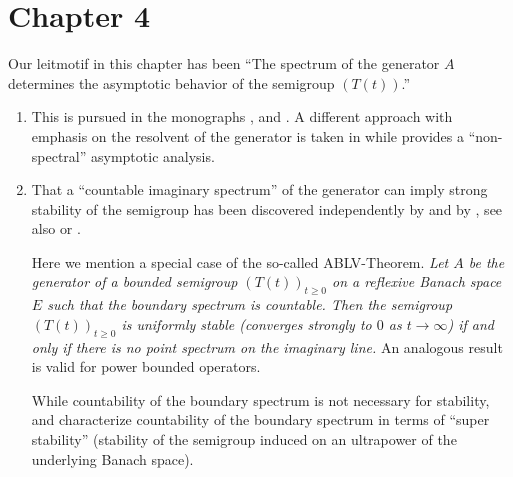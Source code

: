 \section*{Chapter 4}
Our leitmotif in this chapter has been
\enquote{The spectrum of the generator $A$ determines the asymptotic behavior of the semigroup $(T(t))$.}
\begin{enumerate}%

\item 

This is pursued in the monographs \textcite[Chapter V]{zbmath01354832}, 
\textcite[Sections 3 and 4]{zbmath00921898} and \textcite[Chapter III]{zbmath05625330}.
A different approach with emphasis on the resolvent of the generator is taken in 
\textcite[Chapter 5]{zbmath05842872} while  \textcite{zbmath05080033} provides a 
\enquote{non-spectral} asymptotic analysis.

\item
That a \enquote{countable imaginary spectrum} of the generator can imply strong stability of the semigroup has been discovered independently by  \textcite{zbmath04063855} and by \textcite{zbmath04042353}, see also
\textcite[Theorem 5.5.5]{zbmath05842872} or \textcite[Theorem 2.21]{zbmath01354832}.

Here we mention a  special case of the so-called ABLV-Theorem. 
\textit{Let $A$ be the generator of a bounded semigroup $(T(t))_{t\geq 0}$ on a reflexive Banach space $E$ such that the boundary spectrum is countable. 
Then the semigroup  $(T(t))_{t\geq 0}$ is uniformly stable (\ie converges strongly to $0$ as $t \rightarrow \infty$) if and only if there is no point spectrum on the imaginary line. }
An analogous result is valid for power bounded operators. 

While countability of the boundary spectrum  is not necessary for stability, 
\textcite{zbmath00410037} and \textcite{zbmath0493176} characterize countability of the boundary spectrum in terms of \enquote{super stability} (\ie stability of the semigroup induced on an ultrapower of the underlying Banach space).



\end{enumerate}
